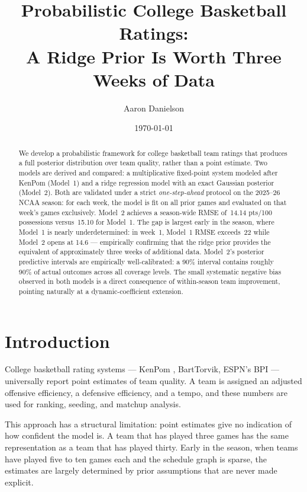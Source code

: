 \documentclass[11pt]{article}
\title{%
  Probabilistic College Basketball Ratings:\\
  A Ridge Prior Is Worth Three Weeks of Data
}
\author{Aaron Danielson}
\date{\today}
\begin{document}
\maketitle

\begin{abstract}
We develop a probabilistic framework for college basketball team ratings that
produces a full posterior distribution over team quality, rather than a point
estimate.  Two models are derived and compared: a multiplicative fixed-point
system modeled after KenPom (Model~1) and a ridge regression model with an
exact Gaussian posterior (Model~2).  Both are validated under a strict
\emph{one-step-ahead} protocol on the 2025--26 NCAA season: for each week, the
model is fit on all prior games and evaluated on that week's games exclusively.
Model~2 achieves a season-wide RMSE of~14.14 pts/100 possessions versus~15.10
for Model~1.  The gap is largest early in the season, where Model~1 is nearly
underdetermined: in week~1, Model~1 RMSE exceeds~22 while Model~2 opens at
14.6 --- empirically confirming that the ridge prior provides the equivalent of
approximately three weeks of additional data.  Model~2's posterior predictive
intervals are empirically well-calibrated: a 90\% interval contains roughly
90\% of actual outcomes across all coverage levels.  The small systematic
negative bias observed in both models is a direct consequence of within-season
team improvement, pointing naturally at a dynamic-coefficient extension.
\end{abstract}

\section{Introduction}

College basketball rating systems --- KenPom \citep{pomeroy2024}, BartTorvik,
ESPN's BPI --- universally report point estimates of team quality.  A team is
assigned an adjusted offensive efficiency, a defensive efficiency, and a tempo,
and these numbers are used for ranking, seeding, and matchup analysis.

This approach has a structural limitation: point estimates give no indication of
how confident the model is.  A team that has played three games has the same
representation as a team that has played thirty.  Early in the season, when
teams have played five to ten games each and the schedule graph is sparse, the
estimates are largely determined by prior assumptions that are never made
explicit.
\end{document}
